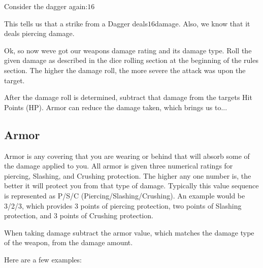 \documentclass[twoside]{book}
\begin{document}
    {  
    Consider the dagger again:\ensuremath{1}\ensuremath{6}\ensuremath{}
    }
  
    {  
    This tells us that a strike from a Dagger deals\ensuremath{1}\ensuremath{6}\ensuremath{}damage. Also, we know that it deals piercing damage.
    }
  
    {  
    Ok, so now weve got our weapons damage rating and its damage type. Roll the given damage as described in the dice rolling section at the beginning of the rules section. The higher the damage roll, the more severe the attack was upon the target.
    }
  
    {  
    After the damage roll is determined, subtract that damage from the targets Hit Points (HP). Armor can reduce the damage taken, which brings us to...
    }
  
    

\subsection{Armor}
    
    {  
    Armor is any covering that you are wearing or behind that will absorb some of the damage applied to you. All armor is given three numerical ratings for piercing, Slashing, and Crushing protection. The higher any one number is, the better it will protect you from that type of damage. Typically this value sequence is represented as P/S/C (Piercing/Slashing/Crushing). An example would be 3/2/3, which provides 3 points of piercing protection, two points of Slashing protection, and 3 points of Crushing protection.
    }
  
    {  
    When taking damage subtract the armor value, which matches the damage type of the weapon, from the damage amount.
    }
  
    {  
    Here are a few examples:
    }
  
  

  
\end{document}

